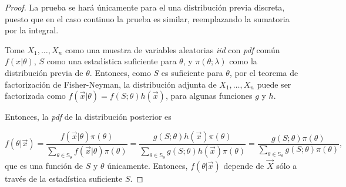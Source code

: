 		\begin{proof}
		La prueba se hará únicamente para el una distribución previa discreta, puesto que en el caso continuo la prueba es similar, reemplazando la sumatoria por la integral.
		
		Tome $X_1,\dots,X_n$ como una muestra de variables aleatorias \textit{iid} con \textit{pdf} común $f(x|\theta)$, $S$ como una estadística suficiente para $\theta$, y $\pi(\theta;\lambda)$ como la distribución previa de $\theta$. Entonces, como $S$ es suficiente para $\theta$, por el teorema de factorización de Fisher-Neyman, la distribución adjunta de $X_1,\dots,X_n$ puede ser factorizada como $f(\vec{x}|\theta)=f(S;\theta)h(\vec{x})$, para algunas funciones $g$ y $h$.
		
		Entonces, la \textit{pdf} de la distribución posterior es
		
		$$f(\theta|\vec{x})=\frac{f(\vec{x}|\theta)\pi(\theta)}{\sum_{\theta\in\mathbb{S}_\theta}f(\vec{x}|\theta)\pi(\theta)}=\frac{g(S;\theta)h(\vec{x})\pi(\theta)}{\sum_{\theta\in\mathbb{S}_\theta} g(S;\theta)h(\vec{x})\pi(\theta)}=\frac{g(S;\theta)\pi(\theta)}{\sum_{\theta\in\mathbb{S}_\theta} g(S;\theta)\pi(\theta)},$$
		que es una función de $S$ y $\theta$ únicamente. Entonces, $f(\theta|\vec{x})$ depende de $\vec{X}$ sólo a través de la estadística suficiente $S$.
		\end{proof}